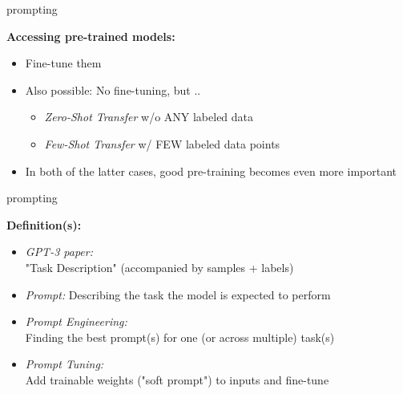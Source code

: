 \documentclass[11pt,compress,t,notes=noshow, xcolor=table]{beamer}
\begin{document}

\begin{vbframe}{prompting}

\vfill

\textbf{Accessing pre-trained models:}

	\begin{itemize}
		\item Fine-tune them
		\item Also possible: No fine-tuning, but .. 
			\begin{itemize}
				\item \textit{Zero-Shot Transfer} w/o ANY labeled data
				\item \textit{Few-Shot Transfer} w/ FEW labeled data points
			\end{itemize}
		\item In both of the latter cases, good pre-training becomes even more important
	\end{itemize}
	
\vfill

\end{vbframe}


\begin{vbframe}{prompting}

\vfill

\textbf{Definition(s):}

	\begin{itemize}
		\item \textit{GPT-3 paper:}\\ "Task Description" (accompanied by samples + labels)
		\item \textit{Prompt:} Describing the task the model is expected to perform
		\item \textit{Prompt Engineering:}\\ Finding the best prompt(s) for one (or across multiple) task(s)
		\item \textit{Prompt Tuning:}\\ Add trainable weights ("soft prompt") to inputs and fine-tune
	\end{itemize}
	
\vfill

\end{vbframe}

\end{document}
